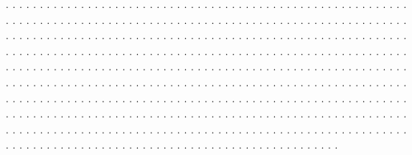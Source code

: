 \documentclass[ 12pt]{article}
\begin{document}
\begin{multicols}{2}[\RLmulticolcolumns,\raggedcolumns]
{\begin{multicols}{2}[\setlength\columnseprule{.4pt}]
. . . . . . . . . . . . . . . . . . . . . . . . . . . . .
. . . . . . . . . . . . . . . . . . . . . . . . . . . . .
. . . . . . . . . . . . . . . . . . . . . . . . . . . . .
. . . . . . . . . . . . . . . . . . . . . . . . . . . . . 
. . . . . . . . . . . . . . . . . . . . . . . . . . . . .
. . . . . . . . . . . . . . . . . . . . . . . . . . . . .
. . . . . . . . . . . . . . . . . . . . . . . . . . . . .
. . . . . . . . . . . . . . . . . . . . . . . . . . . . .
. . . . . . . . . . . . . . . . . . . . . . . . . . . . .
. . . . . . . . . . . . . . . . . . . . . . . . . . . . .
. . . . . . . . . . . . . . . . . . . . . . . . . . . . . 
. . . . . . . . . . . . . . . . . . . . . . . . . . . . .
. . . . . . . . . . . . . . . . . . . . . . . . . . . . .
. . . . . . . . . . . . . . . . . . . . . . . . . . . . .
. . . . . . . . . . . . . . . . . . . . . . . . . . . . .
. . . . . . . . . . . . . . . . . . . . . . . . . . . . .
. . . . . . . . . . . . . . . . . . . . . . . . . . . . . 
. . . . . . . . . . . . . . . . . . . . . . . . . . . . .
. . . . . . . . . . . . . . . . . . . . . . . . . . . . .
. . . . . . . . . . . . . . . . . . . . . . . . . . . . .
\end{multicols}
}
\end{multicols}
\end{document}

